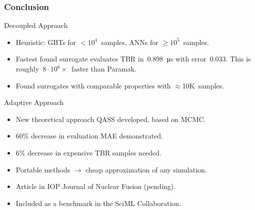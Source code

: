 \begin{frame}
	\frametitle{Conclusion}

	\begin{block}{Decoupled Approach}
		\begin{itemize}
			\setlength\itemsep{0em}
			\item
				Heuristic: \alert{GBTs} for $<10^4$~samples,
				\alert{ANNs} for $\geq10^5$~samples.
			\item
				Fastest found surrogate evaluates TBR in~\SI{0.898}{\micro\second}
				with error~$\num{0.033}$. This is roughly~\alert{$8\cdot
				10^6\times$~faster} than Paramak.
			\item
				Found surrogates with comparable properties with
				\alert{$\approx$10K~samples}.
		\end{itemize}
	\end{block}

	\begin{block}{Adaptive Approach}
		\begin{itemize}
			\setlength\itemsep{0em}
			\item
				New theoretical approach \alert{QASS} developed, based on MCMC.
			\item 
				\alert{$60\%$ decrease} in evaluation MAE demonstrated.
			\item
				\alert{$6\%$ decrease} in expensive TBR samples needed.
		\end{itemize}
	\end{block}

	\begin{itemize}
		\item 
			\alert{Portable} methods $\rightarrow$ cheap approximation of any simulation.
		\item
			Article in IOP \alert{Journal of Nuclear Fusion} (pending).
		\item
			Included as a benchmark in the \alert{SciML Collaboration}.
	\end{itemize}

\end{frame}

